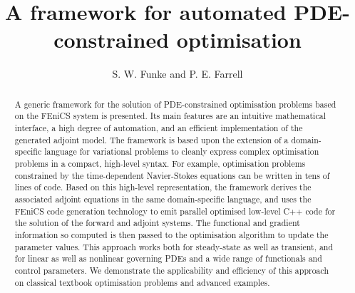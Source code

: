 \documentclass[prodmode,acmtoms]{acmsmall}
\newcommand{\fenics}{{\mbox{FEniCS}}\xspace}
\begin{document}

\title{A framework for automated PDE-constrained optimisation}
\author{S. W. Funke and P. E. Farrell}

\begin{abstract}
A generic framework for the solution of PDE-constrained optimisation problems based on the \fenics system is presented.
Its main features are an intuitive mathematical interface, a high degree of automation, and an efficient implementation of the generated adjoint model.
The framework is based upon the extension of a domain-specific language for variational problems to cleanly express complex optimisation problems in a compact, high-level syntax. 
For example, optimisation problems constrained by the time-dependent Navier-Stokes
equations can be written in tens of lines of code. 
Based on this high-level representation, the framework derives the associated adjoint equations in the same domain-specific language, and uses the FEniCS code generation technology to emit parallel optimised low-level C++ code for the solution of the forward and adjoint systems. 
The functional and gradient information so computed is then passed to the optimisation algorithm to update the parameter values.
This approach works both for steady-state as well as transient, and for linear as well as nonlinear governing PDEs and a wide range of functionals and control parameters.
We demonstrate the applicability and efficiency of this approach on classical textbook optimisation problems and advanced examples.

\end{abstract}




\end{document}

